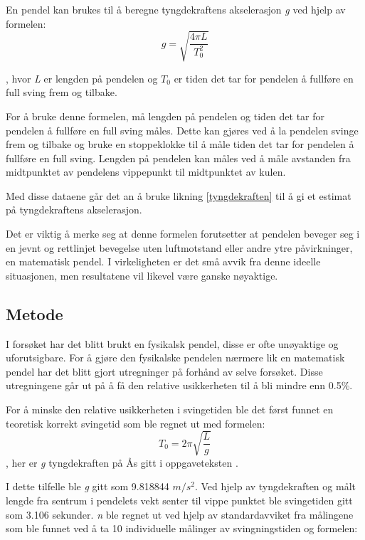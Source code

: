 \documentclass[twocolumn, 11pt]{article} %
\begin{document}
En pendel kan brukes til å beregne tyngdekraftens akselerasjon \textit{g} ved hjelp av formelen:
\begin{equation}
    g = \sqrt{\frac{4 \pi L}{T_0^2}}
    \label{tyngdekraften}
\end{equation}


, hvor \textit{L} er lengden på pendelen og \textit{$T_0$} er tiden det tar for pendelen å fullføre en full sving frem og tilbake.

For å bruke denne formelen, må lengden på pendelen og tiden det tar for pendelen å fullføre en full sving måles. Dette kan gjøres ved å la pendelen svinge frem og tilbake og bruke en stoppeklokke til å måle tiden det tar for pendelen å fullføre en full sving. Lengden på pendelen kan måles ved å måle avstanden fra midtpunktet av pendelens vippepunkt til midtpunktet av kulen.

Med disse dataene går det an å bruke likning \eqref{tyngdekraften} til å gi et estimat på tyngdekraftens akselerasjon.

Det er viktig å merke seg at denne formelen forutsetter at pendelen beveger seg i en jevnt og rettlinjet bevegelse uten luftmotstand eller andre ytre påvirkninger, en matematisk pendel. I virkeligheten er det små avvik fra denne ideelle situasjonen, men resultatene vil likevel være ganske nøyaktige.
\cite{taylor1997error} \cite{Pendel}

\subsection{Metode}
I forsøket har det blitt brukt en fysikalsk pendel, disse er ofte unøyaktige og uforutsigbare. For å gjøre den fysikalske pendelen nærmere lik en matematisk pendel har det blitt gjort utregninger på forhånd av selve forsøket. Disse utregningene går ut på å få den relative usikkerheten til å bli mindre enn 0.5\%.

For å minske den relative usikkerheten i svingetiden ble det først funnet en teoretisk korrekt svingetid som ble regnet ut med formelen:
\begin{equation}
    T_0 = 2\pi\sqrt{\frac{L}{g}}
    \label{svingetid_pendel}
\end{equation}
, her er \textit{g} tyngdekraften på Ås gitt i oppgaveteksten \cite{oppgavetekst}.

I dette tilfelle ble \textit{g} gitt som 9.818844 $m/s^2$. Ved hjelp av tyngdekraften og målt lengde fra sentrum i pendelets vekt senter til vippe punktet ble svingetiden gitt som 3.106 sekunder. \textit{n} ble regnet ut ved hjelp av standardavviket fra målingene som ble funnet ved å ta 10 individuelle målinger av svingningstiden og formelen:
\end{document}
